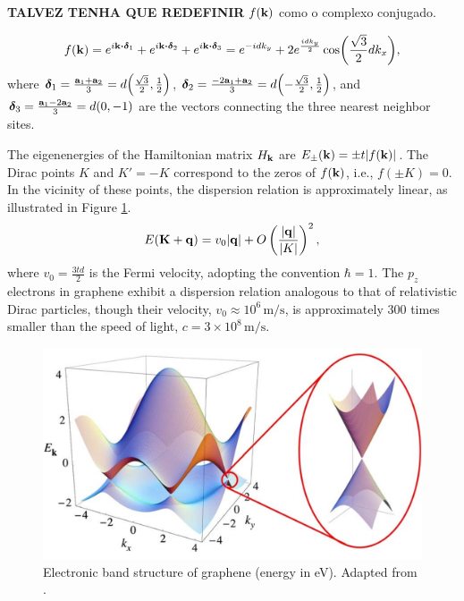 \textbf{TALVEZ TENHA QUE REDEFINIR} $f({\vb{k}})$ como o complexo conjugado.

\begin{equation} \label{eq:monolayer-fk}
f(\k) = e^{i \k \vdot \bm{\delta}_1} + e^{i \k \vdot \bm{\delta}_2} + e^{i \k \vdot \bm{\delta}_3} =
e^{-idk_y} + 2 e^{\frac{idk_y}{2}} \cos(\frac{\sqrt{3}}{2} dk_x),
\end{equation}
where \(\bm{\delta}_1 = \frac{{\vb{a}}_1 + {\vb{a}}_2}{3} = d \qty(\frac{\sqrt{3}}{2}, \frac{1}{2})\), \(\bm{\delta}_2 = \frac{-2 {\vb{a}}_1 + {\vb{a}}_2}{3} = d \qty(-\frac{\sqrt{3}}{2}, \frac{1}{2})\), and \(\bm{\delta}_3 = \frac{{\vb{a}}_1 - 2 {\vb{a}}_2}{3} = d \qty(0, -1)\) are the vectors connecting the three nearest neighbor sites.

The eigenenergies of the Hamiltonian matrix \(H_{\vb{k}}\) are \(E_\pm({\vb{k}}) = \pm t \abs{f({\vb{k}})}\). The Dirac points \(K\) and \(K' = -K\) correspond to the zeros of \(f({\vb{k}})\), i.e., \(f(\pm K) = 0\). In the vicinity of these points, the dispersion relation is approximately linear, as illustrated in Figure \ref{fig:monolayer_dispersion}.
\begin{equation} \label{eq:linear_Ek_monolayer}
E({\vb{K}} + {\vb{q}}) = v_0 \abs{{\vb{q}}} + O\left(\frac{\abs{{\vb{q}}}}{\abs{K}}\right)^2,
\end{equation}
where \( v_0 = \frac{3td}{2} \) is the Fermi velocity, adopting the convention \(\hbar = 1\). The \(p_z\) electrons in graphene exhibit a dispersion relation analogous to that of relativistic Dirac particles, though their velocity, \(v_0 \approx 10^6 \, \text{m/s}\), is approximately 300 times smaller than the speed of light, \(c = 3 \times 10^8 \, \text{m/s}\).

\begin{figure}[H]
\centering
\includegraphics[width=0.8\linewidth]{fig/monolayer_dispersion.png}
\caption{Electronic band structure of graphene (energy in eV). Adapted from \cite{geim2009}.}
\label{fig:monolayer_dispersion}
\end{figure}

